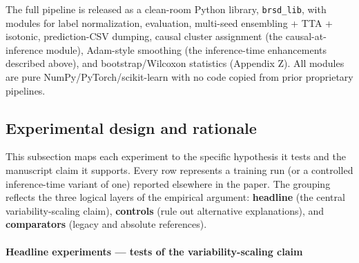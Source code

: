 The full pipeline is released as a clean-room Python library,
\texttt{brsd\_lib}, with modules for label normalization, evaluation,
multi-seed ensembling + TTA + isotonic, prediction-CSV dumping, causal
cluster assignment (the causal-at-inference module), Adam-style smoothing (the inference-time enhancements described above), and
bootstrap/Wilcoxon statistics (Appendix Z). All modules are pure
NumPy/PyTorch/scikit-learn with no code copied from prior proprietary
pipelines.

\subsection{Experimental design and rationale}\label{experimental-design-and-rationale}

This subsection maps each experiment to the specific hypothesis it tests
and the manuscript claim it supports. Every row represents a training
run (or a controlled inference-time variant of one) reported elsewhere
in the paper. The grouping reflects the three logical layers of the
empirical argument: \textbf{headline} (the central variability-scaling
claim), \textbf{controls} (rule out alternative explanations), and
\textbf{comparators} (legacy and absolute references).

\paragraph{Headline experiments --- tests of the variability-scaling
claim}\label{headline-experiments-tests-of-the-variability-scaling-claim}

